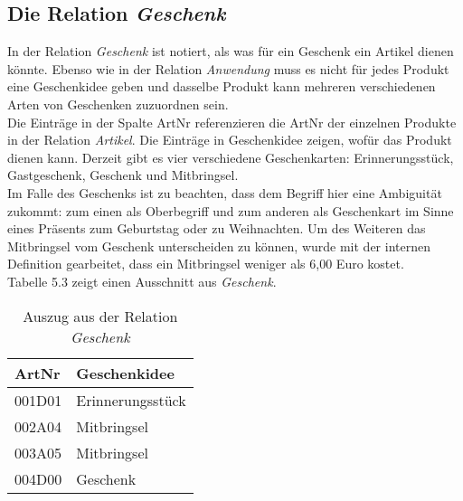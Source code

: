 \subsection{Die Relation \textit{Geschenk}}
\label{sec:Geschenk}
In der Relation \textit{Geschenk} ist notiert, als was für ein Geschenk ein Artikel dienen könnte. Ebenso wie in der Relation \textit{Anwendung} muss es nicht für jedes Produkt eine Geschenkidee geben und dasselbe Produkt kann mehreren verschiedenen Arten von Geschenken zuzuordnen sein.\\
Die Einträge in der Spalte ArtNr referenzieren die ArtNr der einzelnen Produkte in der Relation \textit{Artikel}. Die Einträge in Geschenkidee zeigen, wofür das Produkt dienen kann. Derzeit gibt es vier verschiedene Geschenkarten: Erinnerungsstück, Gastgeschenk, Geschenk und Mitbringsel.\\
Im Falle des Geschenks ist zu beachten, dass dem Begriff hier eine Ambiguität zukommt: zum einen als Oberbegriff und zum anderen als Geschenkart im Sinne eines Präsents zum Geburtstag oder zu Weihnachten. Um des Weiteren das Mitbringsel vom Geschenk unterscheiden zu können, wurde mit der internen Definition gearbeitet, dass ein Mitbringsel weniger als 6,00 Euro kostet.\\
Tabelle 5.3 zeigt einen Ausschnitt aus \textit{Geschenk}.
\begin{table}
\begin{center}
\begin{tabular}{|p{}|p{4cm}|}
	\hline
	ArtNr & Geschenkidee \\ \hline
	001D01 & Erinnerungsstück \\
	002A04 & Mitbringsel \\
	003A05 & Mitbringsel \\
	004D00 & Geschenk\\ \hline
	\end{tabular}
	\caption{Auszug aus der Relation \textit{Geschenk}}
\end{center}
\label{BspGeschenk}
\end{table}
\\


